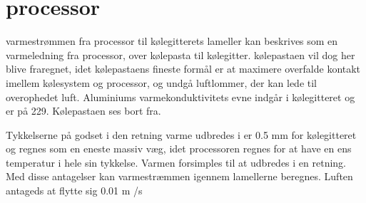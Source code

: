 \section{processor}
varmestrømmen fra processor til kølegitterets lameller kan beskrives som en varmeledning fra processor, over kølepasta til kølegitter. 
kølepastaen vil dog her blive fraregnet, idet kølepastaens fineste formål er at maximere overfalde kontakt imellem kølesystem og processor, og undgå luftlommer, der kan lede til overophedet luft.
Aluminiums varmekonduktivitets evne indgår i kølegitteret og er på 229. Kølepastaen ses bort fra.

Tykkelserne på godset i den retning varme udbredes i er 0.5 mm for kølegitteret og regnes som en eneste massiv væg, idet processoren regnes for at have en ens temperatur i hele sin tykkelse. Varmen forsimples til at udbredes i en retning. Med disse antagelser kan varmestræmmen igennem lamellerne beregnes.
Luften antageds at flytte sig 0.01 m /s